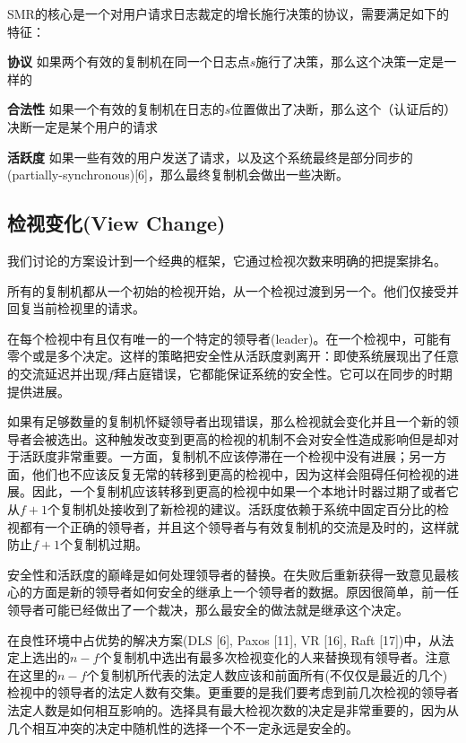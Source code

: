 \documentclass[UTF8]{ctexart}
\begin{document}
SMR的核心是一个对用户请求日志裁定的增长施行决策的协议，需要满足如下的特征：

\textbf{协议} \hspace{3mm} 如果两个有效的复制机在同一个日志点$s$施行了决策，那么这个决策一定是一样的

\textbf{合法性} \hspace{3mm} 如果一个有效的复制机在日志的$s$位置做出了决断，那么这个（认证后的）决断一定是某个用户的请求 

\textbf{活跃度} \hspace{3mm} 如果一些有效的用户发送了请求，以及这个系统最终是部分同步的(partially-synchronous)[6]，那么最终复制机会做出一些决断。

\subsection{检视变化(View Change)}
我们讨论的方案设计到一个经典的框架，它通过检视次数来明确的把提案排名。
 
所有的复制机都从一个初始的检视开始，从一个检视过渡到另一个。他们仅接受并回复当前检视里的请求。

在每个检视中有且仅有唯一的一个特定的领导者(leader)。在一个检视中，可能有零个或是多个决定。这样的策略把安全性从活跃度剥离开：即使系统展现出了任意的交流延迟并出现$f$拜占庭错误，它都能保证系统的安全性。它可以在同步的时期提供进展。

如果有足够数量的复制机怀疑领导者出现错误，那么检视就会变化并且一个新的领导者会被选出。这种触发改变到更高的检视的机制不会对安全性造成影响但是却对于活跃度非常重要。一方面，复制机不应该停滞在一个检视中没有进展；另一方面，他们也不应该反复无常的转移到更高的检视中，因为这样会阻碍任何检视的进展。因此，一个复制机应该转移到更高的检视中如果一个本地计时器过期了或者它从$f+1$个复制机处接收到了新检视的建议。活跃度依赖于系统中固定百分比的检视都有一个正确的领导者，并且这个领导者与有效复制机的交流是及时的，这样就防止$f+1$个复制机过期。

安全性和活跃度的巅峰是如何处理领导者的替换。在失败后重新获得一致意见最核心的方面是新的领导者如何安全的继承上一个领导者的数据。原因很简单，前一任领导者可能已经做出了一个裁决，那么最安全的做法就是继承这个决定。

在良性环境中占优势的解决方案(DLS [6], Paxos [11], VR [16], Raft [17])中，从法定上选出的$n - f$个复制机中选出有最多次检视变化的人来替换现有领导者。注意在这里的$n - f$个复制机所代表的法定人数应该和前面所有(不仅仅是最近的几个)检视中的领导者的法定人数有交集。更重要的是我们要考虑到前几次检视的领导者法定人数是如何相互影响的。选择具有最大检视次数的决定是非常重要的，因为从几个相互冲突的决定中随机性的选择一个不一定永远是安全的。
\end{document}
